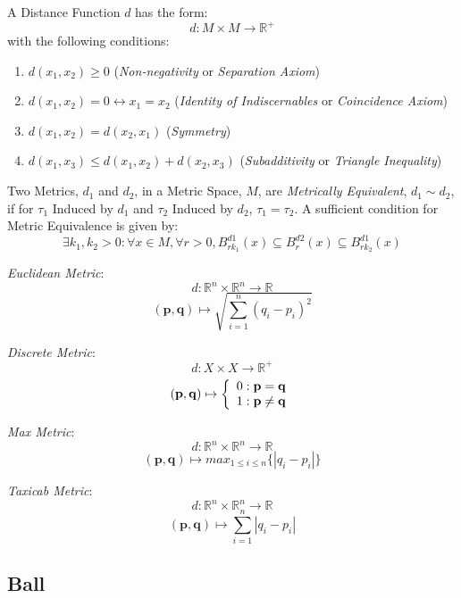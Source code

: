 \documentclass{article}
\begin{document}
A Distance Function $d$ has the form:
\[
    d: M \times M \rightarrow \mathbb{R}^{+}
\]
with the following conditions:
\begin{enumerate}
\item $d(x_1, x_2) \geq 0$ (\emph{Non-negativity} or \emph{Separation
  Axiom})
\item $d(x_1, x_2) = 0 \leftrightarrow x_1 = x_2$ (\emph{Identity of
  Indiscernables} or \emph{Coincidence Axiom})
\item $d(x_1, x_2) = d(x_2, x_1)$ (\emph{Symmetry})
\item $d(x_1, x_3) \leq d(x_1, x_2) + d(x_2, x_3)$
  (\emph{Subadditivity} or \emph{Triangle Inequality})
\end{enumerate}
Two Metrics, $d_1$ and $d_2$, in a Metric Space, $M$, are
\emph{Metrically Equivalent}, $d_1 \sim d_2$, if for $\tau_1$ Induced
by $d_1$ and $\tau_2$ Induced by $d_2$, $\tau_1 = \tau_2$. A
sufficient condition for Metric Equivalence is given by:
\[
    \exists k_1, k_2 > 0 : \forall x \in M, \forall r > 0,
    B^{d1}_{rk_1}(x) \subseteq B^{d2}_r (x) \subseteq B^{d1}_{rk_2}(x)
\]

\emph{Euclidean Metric}:
\[
    d: \mathbb{R}^n \times \mathbb{R}^n \rightarrow \mathbb{R}
\]\[
    (\mathbf{p},\mathbf{q}) \mapsto \sqrt{\sum_{i=1}^{n}(q_i - p_i)^2}
\]

\emph{Discrete Metric}:
\[
    d: X \times X \rightarrow \mathbb{R}^{+}
\]\[
    (\mathbf{p},\mathbf{q}) \mapsto \left\{
    \begin{array}{l l}
        0: \mathbf{p} = \mathbf{q}\\
        1: \mathbf{p} \neq \mathbf{q}
    \end{array}\right.
\]

\emph{Max Metric}:
\[
    d: \mathbb{R}^n \times \mathbb{R}^n \rightarrow \mathbb{R}
\]\[
    (\mathbf{p},\mathbf{q}) \mapsto max_{1 \leq i \leq n}\{|q_i - p_i|\}
\]

\emph{Taxicab Metric}:
\[
    d: \mathbb{R}^n \times \mathbb{R}^n \rightarrow \mathbb{R}
\]\[
    (\mathbf{p},\mathbf{q}) \mapsto \sum_{i=1}^{n}|q_i - p_i|
\]



\subsection{Ball}\label{subsec:metric_ball}
\end{document}
